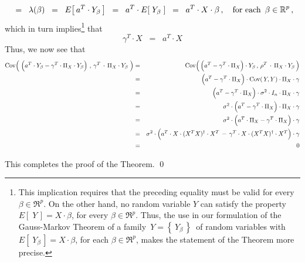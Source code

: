 \begin{enumerate}
\begin{equation*}
	\;\; = \;\;
		\lambda(\beta)
	\;\; = \;\;
		E\!\left[\,a^{T} \cdot Y_{\beta}\,\right]
	\;\; = \;\;
		a^{T} \cdot E\!\left[\;Y_{\beta}\;\right]
	\;\; = \;\;
		a^{T} \cdot X \cdot \beta\,,
	\quad
	\textnormal{for each \,$\beta \in \Re^{p}$}\,,
	\end{equation*}
	which in turn implies{\color{red}\footnote{\color{red}This implication
	requires that the preceding equality must be valid
	for every $\beta \in \Re^{p}$.
	On the other hand, no random variable $Y$ can satisfy the property
	$E\!\left[\;Y\,\right] = X \cdot \beta$, for every $\beta \in \Re^{p}$.
	Thus, the use in our formulation of the Gauss-Markov Theorem
	of a family \,$Y = \left\{\,Y_{\beta}\,\right\}$\, of random variables
	with $E\!\left[\;Y_{\beta}\,\right] = X \cdot \beta$, for each $\beta \in \Re^{p}$,
	makes the statement of the Theorem more precise.}}
	that
	\begin{equation*}
	\gamma^{T} \cdot X
	\;\; = \;\;
		a^{T} \cdot X
	\end{equation*}
	Thus, we now see that
	\begin{eqnarray*}
	\Cov\!\left(\;
		\left(a^{T} \cdot Y_{\beta}
		\overset{{\color{white}.}}{-}
		\gamma^{T} \cdot \Pi_{X} \cdot Y_{\beta}\right)
		\,,\,
		\gamma^{T} \overset{{\color{white}+}}{\cdot} \Pi_{X} \cdot Y_{\beta}
		\;\right)
	&=&
		\Cov\!\left(\,
			\left(a^{T} \overset{{\color{white}.}}{-} \gamma^{T} \cdot \Pi_{X} \right) \cdot Y_{\beta}
			\,,\,
			\rho^{T} \overset{{\color{white}+}}{\cdot} \Pi_{X} \cdot Y_{\beta}
			\,\right)
	\\
	&=&
		\left(a^{T} \overset{{\color{white}.}}{-} \gamma^{T} \cdot \Pi_{X} \right)
		\cdot \Cov\!\left(\,Y,Y\right) \cdot \Pi_{X} \cdot \gamma
	\\
	&=&
		\left(a^{T} \overset{{\color{white}.}}{-} \gamma^{T} \cdot \Pi_{X} \right)
		\cdot \sigma^{2} \cdot I_{n} \cdot \Pi_{X} \cdot \gamma
	\\
	&=&
		\sigma^{2}
		\cdot
		\left(a^{T} \overset{{\color{white}.}}{-} \gamma^{T} \cdot \Pi_{X} \right)
		\cdot \Pi_{X} \cdot \gamma
	\\
	&=&
		\sigma^{2}
		\cdot
		\left(a^{T} \cdot \Pi_{X} \overset{{\color{white}.}}{-} \gamma^{T} \cdot \Pi_{X} \right)
		\cdot \gamma
	\\
	&=&
		\sigma^{2}
		\cdot
		\left(a^{T} \cdot X\cdot(X^{T}X)^{\dagger}\cdot X^{T}
		\,\overset{{\color{white}.}}{-}\,
		\gamma^{T} \cdot X\cdot(X^{T}X)^{\dagger}\cdot X^{T} \right)
		\cdot \gamma
	\\
	&=&
		0
	\end{eqnarray*}
\end{enumerate}
This completes the proof of the Theorem.
\qed


